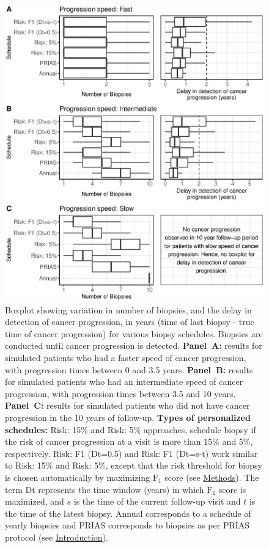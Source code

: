 \begin{figure}[!htb]
\captionsetup{justification=justified}
\centerline{\includegraphics[width=\columnwidth]{images/sim_res_combined.eps}}
\caption{Boxplot showing variation in number of biopsies, and the delay in detection of cancer progression, in years (time of last biopsy - true time of cancer progression) for various biopsy schedules. Biopsies are conducted until cancer progression is detected. \textbf{Panel~A:} results for simulated patients who had a faster speed of cancer progression, with progression times between 0 and 3.5 years. \textbf{Panel~B:} results for simulated patients who had an intermediate speed of cancer progression, with progression times between 3.5 and 10 years. \textbf{Panel~C:} results for simulated patients who did not have cancer progression in the 10 years of follow-up. \textbf{Types of personalized schedules:} Risk: 15\% and Risk: 5\% approaches, schedule biopsy if the risk of cancer progression at a visit is more than 15\% and 5\%, respectively. Risk: F1 (Dt=0.5) and Risk: F1 (Dt=s-t) work similar to Risk: 15\% and Risk: 5\%, except that the risk threshold for biopsy is chosen automatically by maximizing $\mbox{F}_1$ score (see \hyperref[sec:methods]{Methods}). The term Dt represents the time window (years) in which $\mbox{F}_1$ score is maximized, and $s$ is the time of the current follow-up visit and $t$ is the time of the latest biopsy. Annual corresponds to a schedule of yearly biopsies and PRIAS corresponds to biopsies as per PRIAS protocol (see \hyperref[sec:introduction]{Introduction}).}
\label{fig:sim_res_combined}
\end{figure}

